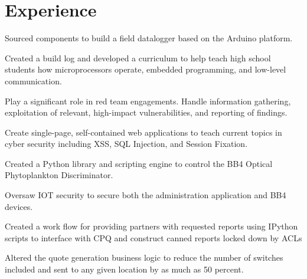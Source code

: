 \documentclass[]{deedy-resume-openfont}
\begin{document}
\begin{minipage}[t]{0.70\textwidth} 


\section{Experience}

\vspace{\topsep}
\begin{tightemize}
\item Sourced components to build a field datalogger based on the Arduino platform.
\item Created a build log and developed a curriculum to help teach high school students how microprocessors operate, embedded programming, and low-level communication. 
\end{tightemize}
\sectionsep

\begin{tightemize}
\item Play a significant role in red team engagements. Handle information gathering, exploitation of relevant, high-impact vulnerabilities, and reporting of findings.
\item Create single-page, self-contained web applications to teach current topics in cyber security including XSS, SQL Injection, and Session Fixation.
\end{tightemize}
\sectionsep

\begin{tightemize}
\item Created a Python library and scripting engine to control the BB4 Optical Phytoplankton Discriminator.
\item Oversaw IOT security to secure both the administration application and BB4 devices.
\end{tightemize}
\sectionsep

\begin{tightemize}
\item Created a work flow for providing partners with requested reports using IPython scripts to interface with CPQ and construct canned reports locked down by ACLs
\item Altered the quote generation business logic to reduce the number of switches included and sent to any given location by as much as 50 percent.
\end{tightemize}
\sectionsep


\end{minipage}
\end{document}
